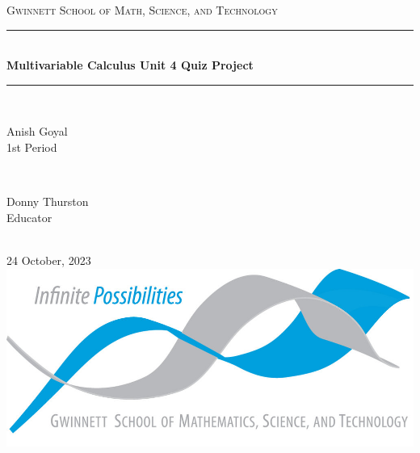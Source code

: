 \begin{titlepage}

    \newcommand{\HRule}{\rule{\linewidth}{0.5mm}}
    
    \center
    
    \vspace{10cm}

    \textsc{\LARGE Gwinnett School of Math, Science, and Technology }\\[0.3cm]
    
    \vspace{0.5cm}

    \HRule \\[0.4cm]
    { \huge \bfseries Multivariable Calculus Unit 4 Quiz Project}\\[0.03cm]
    \HRule \\[1.5cm]
    
    \begin{minipage}{0.4\textwidth}
    \begin{flushleft} \Large
    Anish Goyal \\1st Period
    \end{flushleft}
    \end{minipage}
    ~
    \begin{minipage}{0.4\textwidth}
    \begin{flushright} \Large
    Donny Thurston\\Educator
    \end{flushright}
    \end{minipage}\\[1cm]
    
    {\Large 24 October, 2023}\\[1cm]
    
    \includegraphics{img/logo.png}\\
    \vfill
    \end{titlepage}